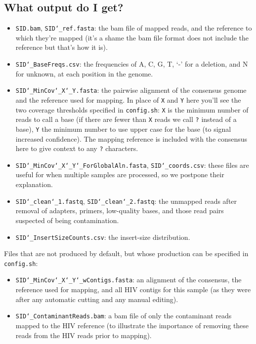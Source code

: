 \documentclass{article}
\let\c\texttt
\begin{document}
\subsection*{What output do I get?}
\begin{itemize}
\item \c{SID.bam}, \c{SID\char`_ref.fasta}: the bam file of mapped reads, and the reference to which they're mapped (it's a shame the bam file format does not include the reference but that's how it is).
\item  \c{SID\char`_BaseFreqs.csv}: the frequencies of A, C, G, T, `-' for a deletion, and N for unknown, at each position in the genome.
\item \c{SID\char`_MinCov\char`_X\char`_Y.fasta}: the pairwise alignment of the consensus genome and the reference used for mapping.
In place of \c{X} and \c{Y} here you'll see the two coverage thresholds specified in \c{config.sh}: \c{X} is the minimum number of reads to call a base (if there are fewer than \c{X} reads we call \c{?} instead of a base), \c{Y} the minimum number to use upper case for the base (to signal increased confidence).
The mapping reference is included with the consensus here to give context to any \c{?} characters.
\item \c{SID\char`_MinCov\char`_X\char`_Y\char`_ForGlobalAln.fasta}, \c{SID\char`_coords.csv}: these files are useful for when multiple samples are processed, so we postpone their explanation.  
\item \c{SID\char`_clean\char`_1.fastq}, \c{SID\char`_clean\char`_2.fastq}: the unmapped reads after removal of adapters, primers, low-quality bases, and those read pairs suspected of being contamination.  
\item \c{SID\char`_InsertSizeCounts.csv}: the insert-size distribution.
\end{itemize}


Files that are not produced by default, but whose production can be specified in \c{config.sh}:
\begin{itemize}
\item \c{SID\char`_MinCov\char`_X\char`_Y\char`_wContigs.fasta}: an alignment of the consensus, the reference used for mapping, and all HIV contigs for this sample (as they were after any automatic cutting and any manual editing).
\item \c{SID\char`_ContaminantReads.bam}: a bam file of only the contaminant reads mapped to the HIV reference (to illustrate the importance of removing these reads from the HIV reads prior to mapping).
\end{itemize}
\end{document}
